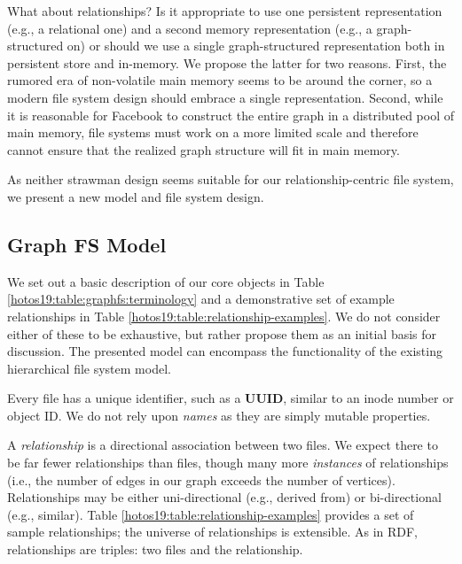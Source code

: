 What about relationships? Is it appropriate
to use one persistent representation (e.g., a relational one) and a second
memory representation (e.g., a graph-structured on) or
should we use a single graph-structured representation both in persistent store
and in-memory.
We propose the latter for two reasons.
First, the rumored era of non-volatile main memory seems to be around the
corner, so a modern file system design should embrace a single
representation.
Second, while it is reasonable for Facebook to construct the entire graph in
a distributed pool of main memory, file systems must work on a more limited
scale and therefore cannot ensure that the realized graph structure will fit
in main memory.

As neither strawman design seems suitable for our relationship-centric file
system, we present a new model and file system design.

\subsection{Graph FS Model}
\label{hotos19:graphfs:model}

We set out a basic description of our core objects in Table \ref{hotos19:table:graphfs:terminology}
and a demonstrative set of example relationships in Table \ref{hotos19:table:relationship-examples}.
We do not consider either of these to be exhaustive, but rather propose them as an initial
basis for discussion.
The presented model can encompass
the functionality of the existing hierarchical file system model.



Every file has a unique identifier, such as a \textbf{UUID}, similar to
an inode number or object ID.
We do not rely upon \textit{names}
as they are simply mutable properties.



A \textit{relationship} is a directional association between two files.  We expect there
to be far fewer relationships than files, though many more \textit{instances} of
relationships (i.e., the number of edges in our graph exceeds the number of vertices).
Relationships may be either uni-directional (e.g., derived from) or
bi-directional (e.g., similar).
Table \ref{hotos19:table:relationship-examples}
provides a set of sample relationships; the universe of relationships
is extensible.
As in RDF, relationships are triples: two files and the relationship.

